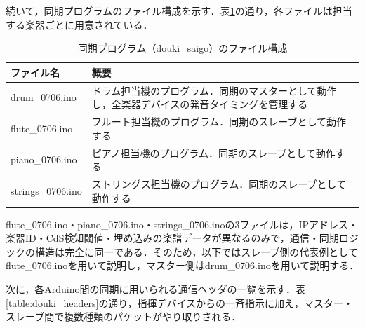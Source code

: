 続いて，同期プログラムのファイル構成を示す．表\ref{table:douki_files}の通り，各ファイルは担当する楽器ごとに用意されている．

\begin{table}[H]
    \caption{同期プログラム（douki\_saigo）のファイル構成}
    \centering
    \label{table:douki_files}
    \begin{tabular}{p{4cm}p{10cm}}
    \hline
    ファイル名 & 概要\\
    \hline\hline
    drum\_0706.ino & ドラム担当機のプログラム．同期のマスターとして動作し，全楽器デバイスの発音タイミングを管理する\\
    \hline
    flute\_0706.ino & フルート担当機のプログラム．同期のスレーブとして動作する\\
    \hline
    piano\_0706.ino & ピアノ担当機のプログラム．同期のスレーブとして動作する\\
    \hline
    strings\_0706.ino & ストリングス担当機のプログラム．同期のスレーブとして動作する\\
    \hline
    \end{tabular}
\end{table}

flute\_0706.ino・piano\_0706.ino・strings\_0706.inoの3ファイルは，IPアドレス・楽器ID・CdS検知閾値・埋め込みの楽譜データが異なるのみで，通信・同期ロジックの構造は完全に同一である．そのため，以下ではスレーブ側の代表例としてflute\_0706.inoを用いて説明し，マスター側はdrum\_0706.inoを用いて説明する．

次に，各Arduino間の同期に用いられる通信ヘッダの一覧を示す．表\ref{table:douki_headers}の通り，指揮デバイスからの一斉指示に加え，マスター・スレーブ間で複数種類のパケットがやり取りされる．

